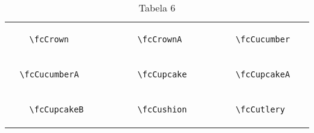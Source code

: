 \documentclass[x11names]{article}
\begin{document}
\begin{table}[H]
\begin{tabular}{|c|c|c|c|c|c|}
		&\multirow{5}{*}{	\fcCrown	[scale=0.8]} & &\multirow{5}{*}{	\fcCrownA	[scale=0.4]} & &\multirow{5}{*}{	\fcCucumber	[scale=0.4]}\\	& & & & & \\	& & & & & \\	\verb|	\fcCrown	| & & \verb|	\fcCrownA	| & & \verb|	\fcCucumber	| & \\	& & & & & \\	& & & & & \\	& & & & & \\	\hline									
		&\multirow{5}{*}{	\fcCucumberA	[scale=0.4]} & &\multirow{5}{*}{	\fcCupcake	[scale=0.8]} & &\multirow{5}{*}{	\fcCupcakeA	[scale=0.3]}\\	& & & & & \\	& & & & & \\	\verb|	\fcCucumberA	| & & \verb|	\fcCupcake	| & & \verb|	\fcCupcakeA	| & \\	& & & & & \\	& & & & & \\	& & & & & \\	\hline									
		&\multirow{5}{*}{	\fcCupcakeB	[scale=0.3]} & &\multirow{5}{*}{	\fcCushion	[scale=0.4]} & &\multirow{5}{*}{	\fcCutlery	[scale=0.4]}\\	& & & & & \\	& & & & & \\	\verb|	\fcCupcakeB	| & & \verb|	\fcCushion	| & & \verb|	\fcCutlery	| & \\	& & & & & \\	& & & & & \\	& & & & & \\		\hline 	\hline 	\end{tabular}	\caption{	Tabela 6	}\label{	Tab6	}\end{table}
\end{document}
